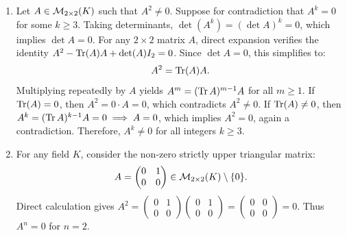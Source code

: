 \begin{exercisesolution}
\label{sol:powers_2x2_nilpotency}

\begin{enumerate}[label=\textbf{(\alph*)}]
    \item Let $A \in \mathcal{M}_{2 \times 2}(K)$ such that $A^2 \ne 0$.
    Suppose for contradiction that $A^k = 0$ for some $k \ge 3$.
    Taking determinants, $\det(A^k) = (\det A)^k = 0$, which implies $\det A = 0$.
    For any $2 \times 2$ matrix $A$, direct expansion verifies the identity $A^2 - \operatorname{Tr}(A)A + \det(A)I_2 = 0$.
    Since $\det A = 0$, this simplifies to:
    \[
    A^2 = \operatorname{Tr}(A) A.
    \]
    Multiplying repeatedly by $A$ yields $A^m = (\operatorname{Tr} A)^{m-1} A$ for all $m \ge 1$.
    If $\operatorname{Tr}(A) = 0$, then $A^2 = 0 \cdot A = 0$, which contradicts $A^2 \ne 0$.
    If $\operatorname{Tr}(A) \ne 0$, then $A^k = (\operatorname{Tr} A)^{k-1} A = 0 \implies A = 0$, which implies $A^2 = 0$, again a contradiction.
    Therefore, $A^k \ne 0$ for all integers $k \ge 3$.

    \item For any field $K$, consider the non-zero strictly upper triangular matrix:
    \[
    A = \begin{pmatrix} 0 & 1 \\ 0 & 0 \end{pmatrix} \in \mathcal{M}_{2 \times 2}(K) \setminus \{0\}.
    \]
    Direct calculation gives $A^2 = \left(\begin{smallmatrix} 0 & 1 \\ 0 & 0 \end{smallmatrix}\right) \left(\begin{smallmatrix} 0 & 1 \\ 0 & 0 \end{smallmatrix}\right) = \left(\begin{smallmatrix} 0 & 0 \\ 0 & 0 \end{smallmatrix}\right) = 0$.
    Thus $A^n = 0$ for $n = 2$. \qedhere
\end{enumerate}
\end{exercisesolution}

